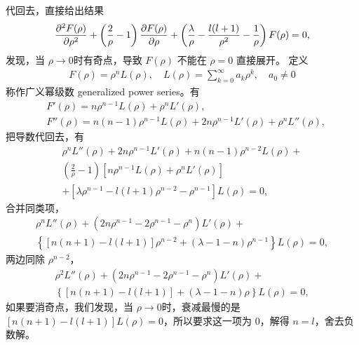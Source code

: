 代回去，直接给出结果
\begin{align}
    \pdv[2]{F(\rho)}{\rho} + \left(\frac2\rho -1\right) \pdv{F(\rho)}{\rho} + \left(
        \frac\lambda\rho - \frac{l(l+1)}{\rho^2} - \frac1\rho
    \right) F(\rho) = 0,
\end{align}
发现，当 $\rho\rightarrow 0$时有奇点，导致 $F(\rho)$ 不能在 $\rho = 0$ 直接展开。
定义
\begin{align}
    F(\rho) = \rho^n L(\rho), \quad L(\rho) = \sum_{k=0}^\infty a_k \rho^k, \quad a_0\neq0
\end{align}
称作广义幂级数 generalized power series。有
\begin{align}
    &F'(\rho) = n\rho^{n-1} L(\rho) + \rho^n L'(\rho), \\
    &F''(\rho) = n(n-1) \rho^{n-1} L(\rho) + 2n\rho^{n-1} L'(\rho) 
    + \rho^n L''(\rho),
\end{align}
把导数代回去，有
\begin{multline}
    \rho^n L ''(\rho) + 2n \rho^{n-1} L'(\rho) + n(n-1) \rho^{n-2} L(\rho) + \\
    \left(\frac2\rho -1\right)
    \left[
        n\rho^{n-1} L(\rho) + \rho^n L'(\rho)
    \right]\\
    + \left[
        \lambda \rho^{n-1} - l(l+1) \rho^{n-2} - \rho^{n-1}
    \right] L(\rho) = 0,
\end{multline}
合并同类项，
\begin{multline}
    \rho^n L''(\rho) +( 2n \rho^{n-1} - 2\rho^{n-1} - \rho^n) L'(\rho) + \\
    \left\{
    [n(n+1) - l (l+1)] \rho^{n-2} + (\lambda - 1-n) \rho^{n-1}
    \right\} L(\rho) = 0,
\end{multline}
两边同除 $\rho^{n-2}$，
\begin{multline}
    \rho^2 L''(\rho) +( 2n \rho^{n-1} - 2\rho^{n-1} - \rho^n) L'(\rho) + \\
    \left\{
    [n(n+1) - l (l+1)] + (\lambda - 1-n)\rho
    \right\} L(\rho) = 0,
\end{multline}
如果要消奇点，我们发现，当 $\rho \rightarrow 0$时，衰减最慢的是 $[n(n+1) - l (l+1)] L(\rho) = 0$，所以要求这一项为 0，解得 $n=l$，舍去负数解。


